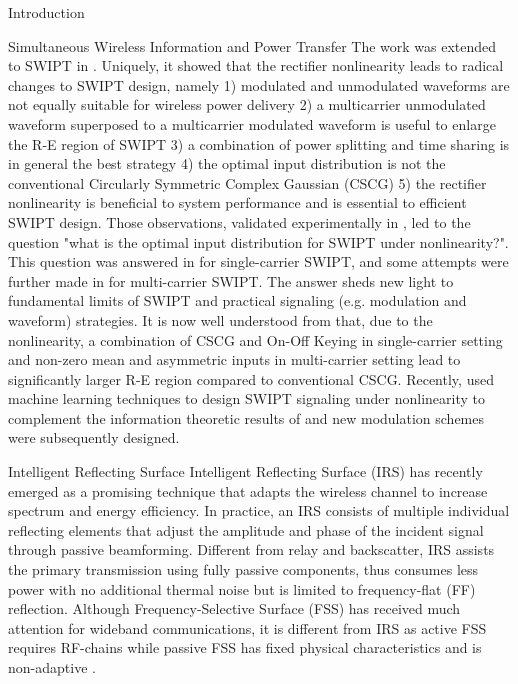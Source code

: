 \documentclass[journal]{IEEEtran}
\begin{document}
\begin{section}{Introduction}
\begin{subsection}{Simultaneous Wireless Information and Power Transfer}
			The work was extended to SWIPT in \cite{Clerckx2018b}. Uniquely, it showed that the rectifier nonlinearity leads to radical changes to SWIPT design, namely 1) modulated and unmodulated waveforms are not equally suitable for wireless power delivery 2) a multicarrier unmodulated waveform superposed to a multicarrier modulated waveform is useful to enlarge the R-E region of SWIPT 3) a combination of power splitting and time sharing is in general the best strategy 4) the optimal input distribution is not the conventional Circularly Symmetric Complex Gaussian (CSCG) 5) the rectifier nonlinearity is beneficial to system performance and is essential to efficient SWIPT design. Those observations, validated experimentally in \cite{Kim2019},  led to the question "what is the optimal input distribution for SWIPT under nonlinearity?". This question was answered in \cite{Varasteh2017} for single-carrier SWIPT, and some attempts were further made in \cite{Varasteh2019b} for multi-carrier SWIPT. The answer sheds new light to fundamental limits of SWIPT and practical signaling (e.g. modulation and waveform) strategies. It is now well understood from \cite{Clerckx2018b,Varasteh2017,Varasteh2019b} that, due to the nonlinearity, a combination of CSCG and On-Off Keying in single-carrier setting and non-zero mean and asymmetric inputs in multi-carrier setting lead to significantly larger R-E region compared to conventional CSCG. Recently, \cite{Varasteh2019a} used machine learning techniques to design SWIPT signaling under nonlinearity to complement the information theoretic results of \cite{Varasteh2017} and new modulation schemes were subsequently designed.
		\end{subsection}


		\begin{subsection}{Intelligent Reflecting Surface}
			Intelligent Reflecting Surface (IRS) has recently emerged as a promising technique that adapts the wireless channel to increase spectrum and energy efficiency. In practice, an IRS consists of multiple individual reflecting elements that adjust the amplitude and phase of the incident signal through passive beamforming. Different from relay and backscatter, IRS assists the primary transmission using fully passive components, thus consumes less power with no additional thermal noise but is limited to frequency-flat (FF) reflection. Although Frequency-Selective Surface (FSS) has received much attention for wideband communications, it is different from IRS as active FSS requires RF-chains \cite{Kim2006} while passive FSS has fixed physical characteristics and is non-adaptive \cite{Anwar2018}.


\end{subsection}
\end{section}
\end{document}
